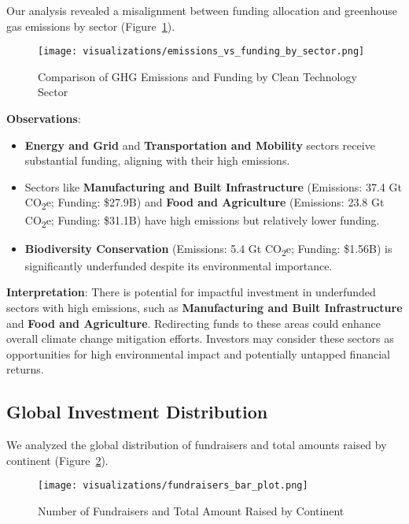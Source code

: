\documentclass[sigconf]{acmart}
\begin{document}
Our analysis revealed a misalignment between funding allocation and greenhouse gas emissions by sector (Figure~\ref{fig:emissions_vs_funding}).

\begin{figure}[htpb]
    \centering
    \texttt{[image: visualizations/emissions\_vs\_funding\_by\_sector.png]}
    \caption{Comparison of GHG Emissions and Funding by Clean Technology Sector}
    \label{fig:emissions_vs_funding}
\end{figure}

\textbf{Observations}:

\begin{itemize}
    \item \textbf{Energy and Grid} and \textbf{Transportation and Mobility} sectors receive substantial funding, aligning with their high emissions.
    \item Sectors like \textbf{Manufacturing and Built Infrastructure} (Emissions: 37.4 Gt CO\textsubscript{2}e; Funding: \$27.9B) and \textbf{Food and Agriculture} (Emissions: 23.8 Gt CO\textsubscript{2}e; Funding: \$31.1B) have high emissions but relatively lower funding.
    \item \textbf{Biodiversity Conservation} (Emissions: 5.4 Gt CO\textsubscript{2}e; Funding: \$1.56B) is significantly underfunded despite its environmental importance.
\end{itemize}

\textbf{Interpretation}: There is potential for impactful investment in underfunded sectors with high emissions, such as \textbf{Manufacturing and Built Infrastructure} and \textbf{Food and Agriculture}. Redirecting funds to these areas could enhance overall climate change mitigation efforts. Investors may consider these sectors as opportunities for high environmental impact and potentially untapped financial returns.

\subsection{Global Investment Distribution}

We analyzed the global distribution of fundraisers and total amounts raised by continent (Figure~\ref{fig:fundraisers_bar}).

\begin{figure}[htpb]
    \centering
    \texttt{[image: visualizations/fundraisers\_bar\_plot.png]}
    \caption{Number of Fundraisers and Total Amount Raised by Continent}
    \label{fig:fundraisers_bar}
\end{figure}
\end{document}
